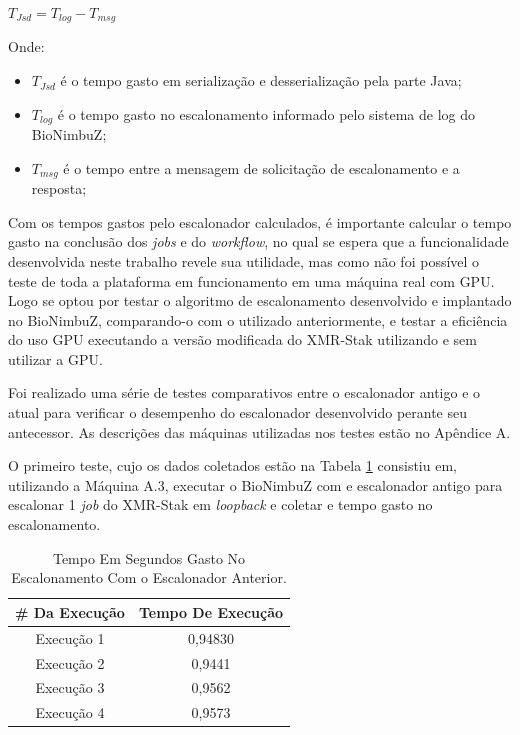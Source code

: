 \centerline{ $T_{Jsd} = T_{log} - T_{msg}$ }

Onde: 
\begin{itemize}
	\item $T_{Jsd}$ é o tempo gasto em serialização e desserialização pela parte Java;
	\item $T_{log}$ é o tempo gasto no escalonamento informado pelo sistema de log do BioNimbuZ;
	\item $T_{msg}$ é o tempo entre a mensagem de solicitação de escalonamento e a resposta;
\end{itemize}

Com os tempos gastos pelo escalonador calculados, é importante calcular o tempo gasto na conclusão dos \textit{jobs} e do \textit{workflow}, no qual se espera que a funcionalidade desenvolvida neste trabalho revele sua utilidade, mas como não foi possível o teste de toda a plataforma em funcionamento em uma máquina real com \acrshort{GPU}. Logo se optou por testar o algoritmo de escalonamento desenvolvido e implantado no BioNimbuZ, comparando-o com o utilizado anteriormente, e testar a eficiência do uso GPU executando a versão modificada do XMR-Stak utilizando e sem utilizar a \acrshort{GPU}.


Foi realizado uma série de testes comparativos entre o escalonador antigo e o atual para verificar o desempenho do escalonador desenvolvido perante seu antecessor. As descrições das máquinas utilizadas nos testes estão no Apêndice A.  %

O primeiro teste, cujo os dados coletados estão na Tabela \ref{TabelaTempoEscalonadorAntigo} consistiu em, utilizando a Máquina A.3, executar o BioNimbuZ com e escalonador antigo para escalonar 1 \textit{job} do XMR-Stak em \textit{loopback} e coletar e tempo gasto no escalonamento.

\begin {table}[H]
\begin{center}
	\begin{tabular}{ |c|c| } 
		\hline
		\#  Da Execução & Tempo De Execução \\ 
		\hline
		Execução 1 & 0,94830 \\ 
		\hline
		Execução 2 & 0,9441 \\ 
		\hline
		Execução 3 & 0,9562 \\ 
		\hline
		Execução 4 & 0,9573 \\ 
		\hline
	\end{tabular}
	\caption {Tempo Em Segundos Gasto No Escalonamento Com o Escalonador Anterior.} \label{TabelaTempoEscalonadorAntigo} 
\end{center}
\end {table}

